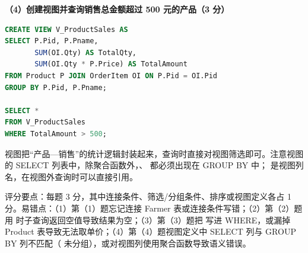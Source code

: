 \documentclass[a4paper,11pt]{article}
\begin{document}
\textbf{（4）创建视图并查询销售总金额超过 500 元的产品（3 分）}
\begin{lstlisting}[language=SQL]
CREATE VIEW V_ProductSales AS
SELECT P.Pid, P.Pname,
       SUM(OI.Qty) AS TotalQty,
       SUM(OI.Qty * P.Price) AS TotalAmount
FROM Product P JOIN OrderItem OI ON P.Pid = OI.Pid
GROUP BY P.Pid, P.Pname;

SELECT *
FROM V_ProductSales
WHERE TotalAmount > 500;
\end{lstlisting}
视图把“产品—销售”的统计逻辑封装起来，查询时直接对视图筛选即可。注意视图的 SELECT 列表中，除聚合函数外，、 都必须出现在 GROUP BY 中； 是视图列名，在视图外查询时可以直接引用。
\begin{analysis}评分要点：每题 3 分，其中连接条件、筛选/分组条件、排序或视图定义各占 1 分。易错点：（1）第（1）题忘记连接 Farmer 表或连接条件写错；（2）第（2）题用  时子查询返回空值导致结果为空；（3）第（3）题把  写进 WHERE，或漏掉 Product 表导致无法取单价；（4）第（4）题视图定义中 SELECT 列与 GROUP BY 列不匹配（ 未分组），或对视图列使用聚合函数导致语义错误。\end{analysis}
\end{document}
